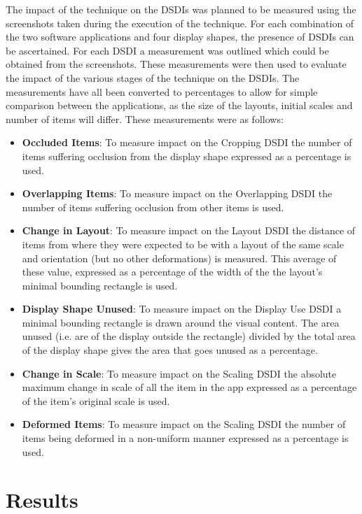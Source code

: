 \documentclass[twocolumn,compsoc]{cvm}
\begin{document}
{The impact of the technique on the \acp{DSDI} was planned to be measured using the screenshots taken during the execution of the technique.
For each combination of the two software applications and four display shapes, the presence of \acp{DSDI} can be ascertained.
For each \ac{DSDI} a measurement was outlined which could be obtained from the screenshots.
These measurements were then used to evaluate the impact of the various stages of the technique on the \acp{DSDI}.
The measurements have all been converted to percentages to allow for simple comparison between the applications, as the size of the layouts, initial scales and number of items will differ.
These measurements were as follows:
\begin{itemize}
  \item \textbf{Occluded Items}: 
  To measure impact on the Cropping \ac{DSDI} the number of items suffering occlusion from the display shape expressed as a percentage is used.
  \item \textbf{Overlapping Items}: 
  To measure impact on the Overlapping \ac{DSDI} the number of items suffering occlusion from other items is used.  
  \item \textbf{Change in Layout}: 
  To measure impact on the Layout \ac{DSDI} the distance of items from where they were expected to be with a layout of the same scale and orientation (but no other deformations) is measured.
  This average of these value, expressed as a percentage of the width of the the layout's minimal bounding rectangle is used.
  \item \textbf{Display Shape Unused}: 
  To measure impact on the Display Use \ac{DSDI} a minimal bounding rectangle is drawn around the visual content.
  The area unused (i.e. are of the display outside the rectangle) divided by the total area of the display shape gives the area that goes unused as a percentage.
  \item \textbf{Change in Scale}: 
  To measure impact on the Scaling \ac{DSDI} the absolute maximum change in scale of all the item in the app expressed as a percentage of the item's original scale is used.
  \item \textbf{Deformed Items}: 
  To measure impact on the Scaling \ac{DSDI}  the number of items being deformed in a non-uniform manner expressed as a percentage is used.
\end{itemize}


\section{Results}
\label{sec:results}

}
\end{document}
